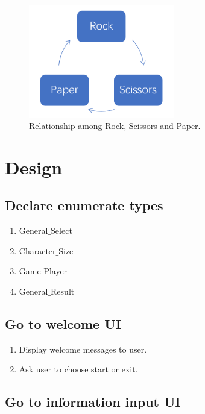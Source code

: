 \documentclass[12pt]{article}
\begin{document}
	\begin{figure}[H]
		\centering
		\includegraphics[width=2.5in]{Figure_1.png}
		\caption{Relationship among Rock, Scissors and Paper.}
	\end{figure}
	
	
	
	\section{Design}
	
	\subsection{Declare enumerate types}
		
		\begin{enumerate}
			\item General$\_$Select
			\item Character$\_$Size
			\item Game$\_$Player
			\item General$\_$Result
		\end{enumerate}
	
	\subsection{Go to welcome UI}
		
		\begin{enumerate}
			\item Display welcome messages to user.
			\item Ask user to choose start or exit.
		\end{enumerate}
		
	\subsection{Go to information input UI}
		
\end{document}
